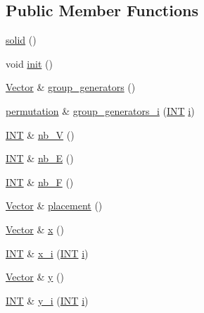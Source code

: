 \subsection*{Public Member Functions}
\begin{DoxyCompactItemize}
\item 
\mbox{\hyperlink{classsolid_a27e2f13966fd3b10b34b42c07b3a0e90}{solid}} ()
\item 
void \mbox{\hyperlink{classsolid_afc711954316958b35630fbc8542bcd05}{init}} ()
\item 
\mbox{\hyperlink{class_vector}{Vector}} \& \mbox{\hyperlink{classsolid_a3ec669f29fac875a8a05882714e8a896}{group\+\_\+generators}} ()
\item 
\mbox{\hyperlink{classpermutation}{permutation}} \& \mbox{\hyperlink{classsolid_a3736981de8dcd03683b4392a94c54a5c}{group\+\_\+generators\+\_\+i}} (\mbox{\hyperlink{galois_8h_a09fddde158a3a20bd2dcadb609de11dc}{I\+NT}} \mbox{\hyperlink{alphabet2_8_c_acb559820d9ca11295b4500f179ef6392}{i}})
\item 
\mbox{\hyperlink{galois_8h_a09fddde158a3a20bd2dcadb609de11dc}{I\+NT}} \& \mbox{\hyperlink{classsolid_aca646d2fdafa24105634c4959caa88c8}{nb\+\_\+V}} ()
\item 
\mbox{\hyperlink{galois_8h_a09fddde158a3a20bd2dcadb609de11dc}{I\+NT}} \& \mbox{\hyperlink{classsolid_abf4c4af23b0746c618d03d63b32a9e7e}{nb\+\_\+E}} ()
\item 
\mbox{\hyperlink{galois_8h_a09fddde158a3a20bd2dcadb609de11dc}{I\+NT}} \& \mbox{\hyperlink{classsolid_a476fed0721c9fb1532618dd96db251d6}{nb\+\_\+F}} ()
\item 
\mbox{\hyperlink{class_vector}{Vector}} \& \mbox{\hyperlink{classsolid_ac06c1e06d6dc5c6f43b1c850892548c8}{placement}} ()
\item 
\mbox{\hyperlink{class_vector}{Vector}} \& \mbox{\hyperlink{classsolid_ab9c0f7598fe0b626a7f819d04b935996}{x}} ()
\item 
\mbox{\hyperlink{galois_8h_a09fddde158a3a20bd2dcadb609de11dc}{I\+NT}} \& \mbox{\hyperlink{classsolid_a701de0f753ff85c6e3e05fbd5ffcf8b4}{x\+\_\+i}} (\mbox{\hyperlink{galois_8h_a09fddde158a3a20bd2dcadb609de11dc}{I\+NT}} \mbox{\hyperlink{alphabet2_8_c_acb559820d9ca11295b4500f179ef6392}{i}})
\item 
\mbox{\hyperlink{class_vector}{Vector}} \& \mbox{\hyperlink{classsolid_a3573a3af71aa86cf6d609442f19ca4b0}{y}} ()
\item 
\mbox{\hyperlink{galois_8h_a09fddde158a3a20bd2dcadb609de11dc}{I\+NT}} \& \mbox{\hyperlink{classsolid_a962e53cd90bf6f5bd8128ac940b2ffa9}{y\+\_\+i}} (\mbox{\hyperlink{galois_8h_a09fddde158a3a20bd2dcadb609de11dc}{I\+NT}} \mbox{\hyperlink{alphabet2_8_c_acb559820d9ca11295b4500f179ef6392}{i}})

\end{DoxyCompactItemize}
